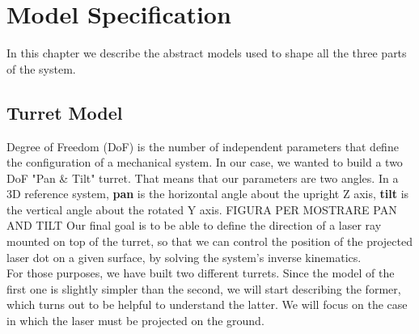 \chapter{Model Specification}
\label{chap:1} 
In this chapter we describe the abstract models used to shape all the three parts of the system.
\section{Turret Model}
Degree of Freedom (DoF) is the number of independent parameters that define the configuration of a mechanical system. In our case, we wanted to build a two DoF "Pan \& Tilt" turret. That means that our parameters are two angles. In a 3D reference system, \textbf{pan} is the horizontal angle about the upright Z axis, \textbf{tilt} is the vertical angle about the rotated Y axis. FIGURA PER MOSTRARE PAN AND TILT
Our final goal is to be able to define the direction of a laser ray mounted on top of the turret, so that we can control the position of the projected laser dot on a given surface, by solving the system's inverse kinematics.\\

For those purposes, we have built two different turrets. Since the model of the first one is slightly simpler than the second, we will start describing the former, which turns out to be helpful to understand the latter. We will focus on the case in which the laser must be projected on the ground.


